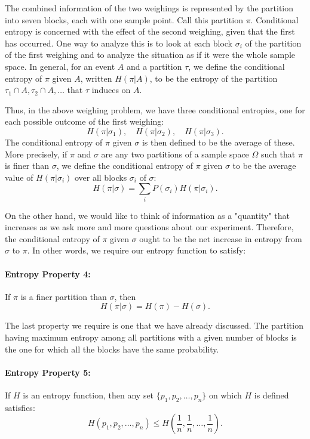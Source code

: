 \documentclass{report}
\begin{document}
The combined information of the two weighings is represented by the partition into seven blocks, each with one sample point. Call this partition \( \pi \). Conditional entropy is concerned with the effect of the second weighing, given that the first has occurred. One way to analyze this is to look at each block \( \sigma_i \) of the partition of the first weighing and to analyze the situation as if it were the whole sample space. In general, for an event \( A \) and a partition \( \tau \), we define the conditional entropy of \( \pi \) given \( A \), written \( H(\pi|A) \), to be the entropy of the partition \( \tau_1 \cap A, \tau_2 \cap A, \ldots \) that \( \tau \) induces on \( A \). 

Thus, in the above weighing problem, we have three conditional entropies, one for each possible outcome of the first weighing:
\[
H(\pi|\sigma_1), \quad H(\pi|\sigma_2), \quad H(\pi|\sigma_3).
\]
The conditional entropy of \( \pi \) given \( \sigma \) is then defined to be the average of these. More precisely, if \( \pi \) and \( \sigma \) are any two partitions of a sample space \( \Omega \) such that \( \pi \) is finer than \( \sigma \), we define the conditional entropy of \( \pi \) given \( \sigma \) to be the average value of \( H(\pi|\sigma_i) \) over all blocks \( \sigma_i \) of \( \sigma \):
\[
H(\pi|\sigma) = \sum_i P(\sigma_i) H(\pi|\sigma_i).
\]

On the other hand, we would like to think of information as a "quantity" that increases as we ask more and more questions about our experiment. Therefore, the conditional entropy of \( \pi \) given \( \sigma \) ought to be the net increase in entropy from \( \sigma \) to \( \pi \). In other words, we require our entropy function to satisfy:

\paragraph{Entropy Property 4:} 
If \( \pi \) is a finer partition than \( \sigma \), then
\[
H(\pi|\sigma) = H(\pi) - H(\sigma).
\]

The last property we require is one that we have already discussed. The partition having maximum entropy among all partitions with a given number of blocks is the one for which all the blocks have the same probability.

\paragraph{Entropy Property 5:} 
If \( H \) is an entropy function, then any set \( \{p_1, p_2, \ldots, p_n\} \) on which \( H \) is defined satisfies:
\[
H(p_1, p_2, \ldots, p_n) \leq H\left(\frac{1}{n}, \frac{1}{n}, \ldots, \frac{1}{n}\right).
\]
\end{document}
